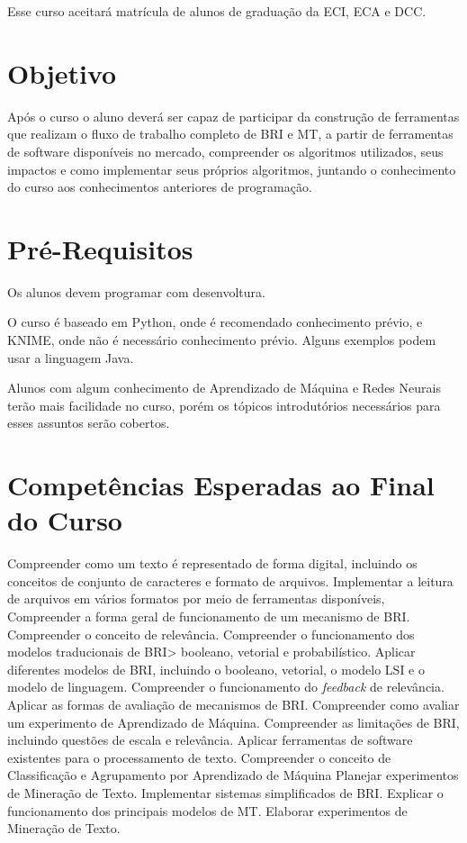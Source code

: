 \documentclass{article}
\begin{document}
Esse curso aceitará matrícula de alunos de graduação da ECI, ECA e DCC.

\section{Objetivo}

Após o curso o aluno deverá ser capaz de participar da construção de ferramentas que realizam o fluxo de trabalho completo de BRI e MT, a partir de ferramentas de software disponíveis no mercado, compreender os algoritmos utilizados, seus impactos e como implementar seus próprios algoritmos, juntando o conhecimento do curso aos conhecimentos anteriores de programação.

\section{Pré-Requisitos}

Os alunos devem programar com desenvoltura. 

O curso é baseado em Python, onde é recomendado conhecimento prévio, e KNIME, onde não é necessário conhecimento prévio. Alguns exemplos podem usar a linguagem Java. 

Alunos com algum conhecimento de Aprendizado de Máquina e Redes Neurais terão mais facilidade no curso, porém os tópicos introdutórios necessários para esses assuntos serão cobertos. 

\section{Competências Esperadas ao Final do Curso}



\begin{outline}
    \1 Compreender como um texto é representado de forma digital, incluindo os conceitos de conjunto de caracteres e formato de arquivos.
    \1 Implementar a leitura de arquivos em vários formatos por meio de ferramentas disponíveis,
    \1 Compreender a forma geral de funcionamento de um mecanismo de BRI.
    \1 Compreender o conceito de relevância.
    \2 Compreender o funcionamento dos modelos traducionais de BRI> booleano, vetorial e probabilístico.
    \1 Aplicar diferentes modelos de BRI, incluindo o  booleano, vetorial, o modelo LSI e o modelo de linguagem.
    \1 Compreender o funcionamento do \textit{feedback} de relevância.
    \1 Aplicar as formas de avaliação de mecanismos de BRI.
    \1 Compreender como avaliar um experimento de Aprendizado de Máquina.
    \1 Compreender as limitações de BRI, incluindo questões de escala e relevância.
    \1 Aplicar ferramentas de software existentes para o processamento de texto.
    \1 Compreender o conceito de Classificação e Agrupamento por Aprendizado de Máquina 
    \1 Planejar experimentos de Mineração de Texto.
    \1 Implementar sistemas simplificados de BRI.
    \1 Explicar o funcionamento dos principais modelos de MT. 
    \1 Elaborar experimentos de Mineração de Texto.
    
\end{outline}
\end{document}
